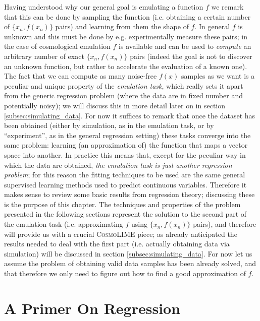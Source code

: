 Having understood why our general goal is emulating a function $f$ we remark that this can be done by sampling the function (i.e. obtaining a certain number of $\{x_n, f(x_n)\}$ pairs) and learning from them the shape of $f$. 
In general $f$ is unknown and this must be done by e.g. experimentally measure these pairs; in the case of cosmological emulation $f$ is available and can be used to \emph{compute} an arbitrary number of exact $\{x_n, f(x_n)\}$ pairs (indeed the goal is not to discover an unknown function, but rather to accelerate the evaluation of a known one).
The fact that we can compute as many noise-free $f(x)$ samples as we want is a peculiar and unique property of the \emph{emulation task}, which really sets it apart from the generic regression problem (where the data are in fixed number and potentially noisy); we will discuss this in more detail later on in section \ref{subsec:simulating_data}. For now it suffices to remark that once the dataset has been obtained (either by simulation, as in the emulation task, or by ``experiment'', as in the general regression setting) these tasks converge into the same problem: learning (an approximation of) the function that maps a vector space into another. In practice this means that, except for the peculiar way in which the data are obtained, \emph{the emulation task is just another regression problem}; for this reason the fitting techniques to be used are the same general supervised learning methods used to predict continuous variables. Therefore it makes sense to review some basic results from regression theory; discussing these is the purpose of this chapter. The techniques and properties of the problem presented in the following sections represent the solution to the second part of the emulation task (i.e. approximating $f$ using $\{x_n, f(x_n)\}$ pairs), and therefore will provide us with a crucial \textsc{CosmoLIME} piece; as already anticipated the results needed to deal with the first part (i.e. actually obtaining data via simulation) will be discussed in section \ref{subsec:simulating_data}. For now let us assume the problem of obtaining valid data samples has been already solved, and that therefore we only need to figure out how to find a good approximation of $f$.

\section{A Primer On Regression}
